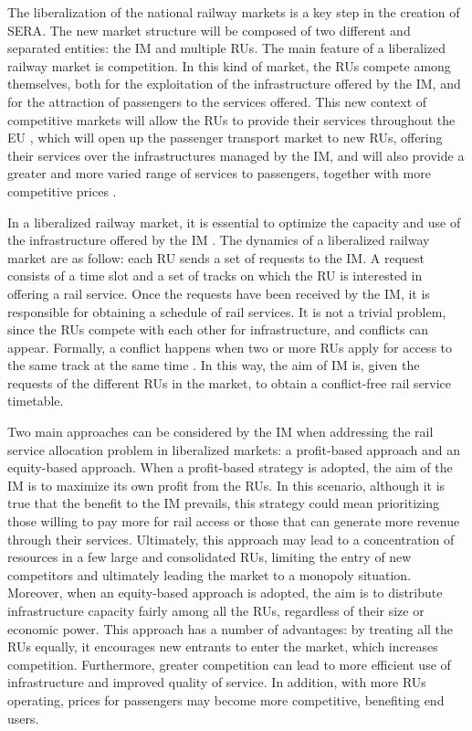 \documentclass[preprint,12pt]{elsarticle}
\begin{document}
The liberalization of the national railway markets is a key step in the creation of \gls{SERA}. The new market structure will be composed of two different and separated entities: the \gls{IM} and multiple \glspl{RU}. The main feature of a liberalized railway market is competition. In this kind of market, the \glspl{RU} compete among themselves, both for the exploitation of the infrastructure offered by the \gls{IM}, and for the attraction of passengers to the services offered. This new context of competitive markets will allow the \glspl{RU} to provide their services throughout the \gls{EU} \cite{Caramello2017}, which will open up the passenger transport market to new \glspl{RU}, offering their services over the infrastructures managed by the \gls{IM}, and will also provide a greater and more varied range of services to passengers, together with more competitive prices \cite{Caramello2017}.

In a liberalized railway market, it is essential to optimize the capacity and use of the infrastructure offered by the \gls{IM} \cite{Smoliner2018}. The dynamics of a liberalized railway market are as follow: each \gls{RU} sends a set of requests to the \gls{IM}. A request consists of a time slot and a set of tracks on which the \gls{RU} is interested in offering a rail service. Once the requests have been received by the \gls{IM}, it is responsible for obtaining a schedule of rail services. It is not a trivial problem, since the \glspl{RU} compete with each other for infrastructure, and conflicts can appear. Formally, a conflict happens when two or more \glspl{RU} apply for access to the same track at the same time \cite{Schlechte2012}. In this way, the aim of \gls{IM} is, given the requests of the different \glspl{RU} in the market, to obtain a conflict-free rail service timetable. 

Two main approaches can be considered by the \gls{IM} when addressing the rail service allocation problem in liberalized markets: a profit-based approach and an equity-based approach. When a profit-based strategy is adopted, the aim of the \gls{IM} is to maximize its own profit from the \glspl{RU}. In this scenario, although it is true that the benefit to the \gls{IM} prevails, this strategy could mean prioritizing those willing to pay more for rail access or those that can generate more revenue through their services. Ultimately, this approach may lead to a concentration of resources in a few large and consolidated \glspl{RU}, limiting the entry of new competitors and ultimately leading the market to a monopoly situation. Moreover, when an equity-based approach \cite{Shao2022Equity-orientedSystem} is adopted, the aim is to distribute infrastructure capacity fairly among all the \glspl{RU}, regardless of their size or economic power. This approach has a number of advantages: by treating all the \glspl{RU} equally, it encourages new entrants to enter the market, which increases competition. Furthermore, greater competition can lead to more efficient use of infrastructure and improved quality of service. In addition, with more \glspl{RU} operating, prices for passengers may become more competitive, benefiting end users.
\end{document}
